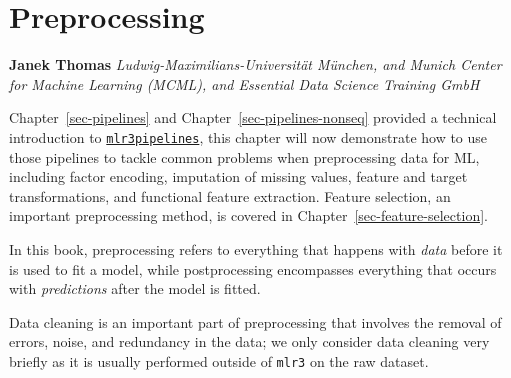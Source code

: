 \hypertarget{sec-preprocessing}{%
\chapter{Preprocessing}\label{sec-preprocessing}}

\vspace{-15mm}

\textbf{Janek Thomas} \newline  \emph{Ludwig-Maximilians-Universität
München, and Munich Center for Machine Learning (MCML), and Essential
Data Science Training GmbH} \newline \newline 

Chapter~\ref{sec-pipelines} and Chapter~\ref{sec-pipelines-nonseq}
provided a technical introduction to
\href{https://mlr3pipelines.mlr-org.com}{\texttt{mlr3pipelines}},
this chapter will now demonstrate how to use those pipelines to tackle
common problems when preprocessing data for ML,
including factor encoding,
imputation of missing values, feature and target
transformations, and functional feature
extraction. Feature selection, an important
preprocessing method, is covered in Chapter~\ref{sec-feature-selection}.

In this book, preprocessing refers to everything that happens with
\emph{data} before it is used to fit a model, while
postprocessing encompasses everything that occurs
with \emph{predictions} after the model is fitted.

Data cleaning
is an important part of preprocessing that involves the removal of
errors, noise, and redundancy in the data; we only consider data
cleaning very briefly as it is usually performed outside of
\texttt{mlr3} on the raw dataset.

